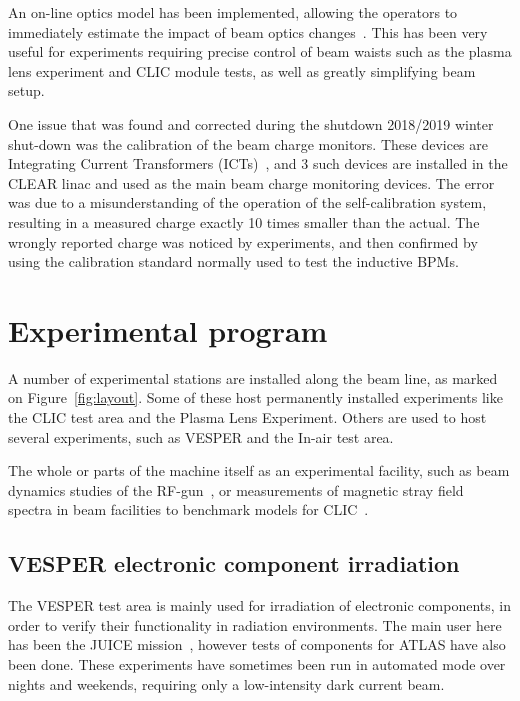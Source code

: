\documentclass[a4paper,
               keeplastbox,   %
               ]{jacow}
\begin{document}

An on-line optics model has been implemented, allowing the operators to immediately estimate the impact of beam optics changes~\cite{Erik::CLEARrev}.
This has been very useful for experiments requiring precise control of beam waists such as the plasma lens experiment and CLIC module tests, as well as greatly simplifying beam setup.

One issue that was found and corrected during the shutdown 2018/2019 winter shut-down was the calibration of the beam charge monitors.
These devices are Integrating Current Transformers (ICTs)~\cite{BergozICT}, and 3 such devices are installed in the CLEAR linac and used as the main beam charge monitoring devices.
The error was due to a misunderstanding of the operation of the self-calibration system, resulting in a measured charge exactly 10 times smaller than the actual.
The wrongly reported charge was noticed by experiments, and then confirmed by using the calibration standard normally used to test the inductive BPMs.

\section{Experimental program}

A number of experimental stations are installed along the beam line, as marked on Figure~\ref{fig:layout}.
Some of these host permanently installed experiments like the CLIC test area and the Plasma Lens Experiment.
Others are used to host several experiments, such as VESPER and the In-air test area.

The whole or parts of the machine itself as an experimental facility, such as beam dynamics studies of the RF-gun~\cite{LucaGun}, or measurements of magnetic stray field spectra in beam facilities to benchmark models for CLIC~\cite{Gohil:IPAC19-MOPGW081}.

\subsection{VESPER electronic component irradiation}
The VESPER test area is mainly used for irradiation of electronic components, in order to verify their functionality in radiation environments.
The main user here has been the JUICE mission~\cite{MarisTali:E-SEU,MarisTali:E-SEL,RubenAlia::CLEARrev}, however tests of components for ATLAS have also been done.
These experiments have sometimes been run in automated mode over nights and weekends, requiring only a low-intensity dark current beam.
\end{document}
